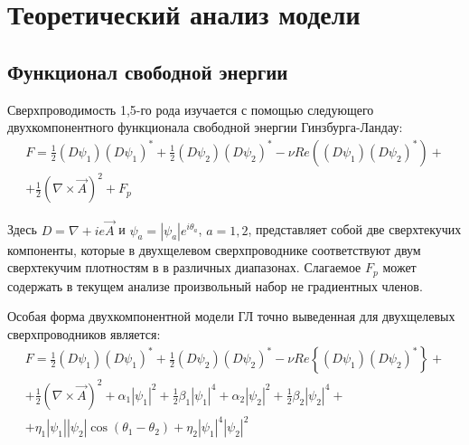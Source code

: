 \chapter{Теоретический анализ модели}

\section{Функционал свободной энергии}

Сверхпроводимость 1,5-го рода изучается с помощью следующего двухкомпонентного 
функционала свободной энергии Гинзбурга-Ландау:
\begin{gather}
    F = \frac{1}{2}(D\psi_1)(D\psi_1)^* + \frac{1}{2}(D\psi_2)(D\psi_2)^* - 
        \nu Re\left( (D\psi_1)(D\psi_2)^* \right) + \nonumber \\
        + \frac{1}{2}\left(\nabla\times\vec{A}\right)^2 + F_p
    \label{eq:1}
\end{gather}

Здесь \( D = \nabla + ie\vec{A} \) и \( \psi_a = |\psi_a|e^{i\theta_a} \), 
\( a = 1,2 \), представляет собой две сверхтекучих компоненты, которые в 
двухщелевом сверхпроводнике соответствуют двум сверхтекучим плотностям в 
в различных диапазонах. Слагаемое \( F_p \) может содержать в текущем анализе 
произвольный набор не градиентных членов.

Особая форма двухкомпонентной модели ГЛ точно выведенная 
\cite{bib:8,bib:9,bib:10} для двухщелевых сверхпроводников является:
\begin{gather}
    F = \frac{1}{2}(D\psi_1)(D\psi_1)^* + \frac{1}{2}(D\psi_2)(D\psi_2)^* - 
        \nu Re\left\{ (D\psi_1)(D\psi_2)^* \right\} + \nonumber \\
        + \frac{1}{2}\left(\nabla\times\vec{A}\right)^2 + 
        \alpha_1|\psi_1|^2 + \frac{1}{2}\beta_1|\psi_1|^4 + 
        \alpha_2|\psi_2|^2 + \frac{1}{2}\beta_2|\psi_2|^4 + \nonumber \\
        + \eta_1|\psi_1||\psi_2| \cos(\theta_1-\theta_2) + 
        \eta_2|\psi_1|^4|\psi_2|^2
    \label{eq:2}
\end{gather}

